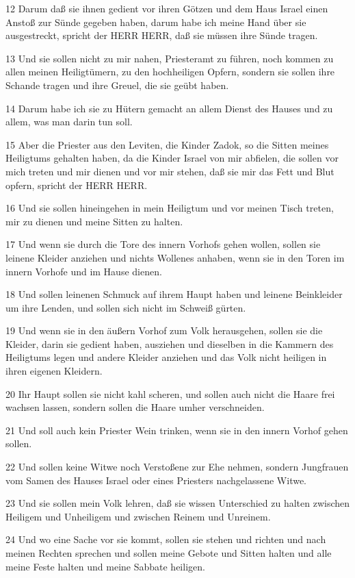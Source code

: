 \par 12 Darum daß sie ihnen gedient vor ihren Götzen und dem Haus Israel einen Anstoß zur Sünde gegeben haben, darum habe ich meine Hand über sie ausgestreckt, spricht der HERR HERR, daß sie müssen ihre Sünde tragen.
\par 13 Und sie sollen nicht zu mir nahen, Priesteramt zu führen, noch kommen zu allen meinen Heiligtümern, zu den hochheiligen Opfern, sondern sie sollen ihre Schande tragen und ihre Greuel, die sie geübt haben.
\par 14 Darum habe ich sie zu Hütern gemacht an allem Dienst des Hauses und zu allem, was man darin tun soll.
\par 15 Aber die Priester aus den Leviten, die Kinder Zadok, so die Sitten meines Heiligtums gehalten haben, da die Kinder Israel von mir abfielen, die sollen vor mich treten und mir dienen und vor mir stehen, daß sie mir das Fett und Blut opfern, spricht der HERR HERR.
\par 16 Und sie sollen hineingehen in mein Heiligtum und vor meinen Tisch treten, mir zu dienen und meine Sitten zu halten.
\par 17 Und wenn sie durch die Tore des innern Vorhofs gehen wollen, sollen sie leinene Kleider anziehen und nichts Wollenes anhaben, wenn sie in den Toren im innern Vorhofe und im Hause dienen.
\par 18 Und sollen leinenen Schmuck auf ihrem Haupt haben und leinene Beinkleider um ihre Lenden, und sollen sich nicht im Schweiß gürten.
\par 19 Und wenn sie in den äußern Vorhof zum Volk herausgehen, sollen sie die Kleider, darin sie gedient haben, ausziehen und dieselben in die Kammern des Heiligtums legen und andere Kleider anziehen und das Volk nicht heiligen in ihren eigenen Kleidern.
\par 20 Ihr Haupt sollen sie nicht kahl scheren, und sollen auch nicht die Haare frei wachsen lassen, sondern sollen die Haare umher verschneiden.
\par 21 Und soll auch kein Priester Wein trinken, wenn sie in den innern Vorhof gehen sollen.
\par 22 Und sollen keine Witwe noch Verstoßene zur Ehe nehmen, sondern Jungfrauen vom Samen des Hauses Israel oder eines Priesters nachgelassene Witwe.
\par 23 Und sie sollen mein Volk lehren, daß sie wissen Unterschied zu halten zwischen Heiligem und Unheiligem und zwischen Reinem und Unreinem.
\par 24 Und wo eine Sache vor sie kommt, sollen sie stehen und richten und nach meinen Rechten sprechen und sollen meine Gebote und Sitten halten und alle meine Feste halten und meine Sabbate heiligen.
